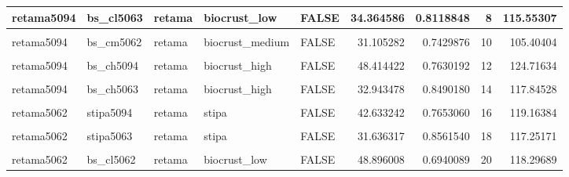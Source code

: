 \documentclass[]{article}
\begin{document}
\begin{table}[H]
{\begin{tabular}[t]{l|l|l|l|l|r|r|r|r}
\hline
retama5094 & bs\_cl5063 & retama & biocrust\_low & FALSE & 34.364586 & 0.8118848 & 8 & 115.55307\\
\hline
\cellcolor{gray!6}{retama5094} & \cellcolor{gray!6}{bs\_cm5094} & \cellcolor{gray!6}{retama} & \cellcolor{gray!6}{biocrust\_medium} & \cellcolor{gray!6}{FALSE} & \cellcolor{gray!6}{44.099499} & \cellcolor{gray!6}{0.8808309} & \cellcolor{gray!6}{9} & \cellcolor{gray!6}{132.18258}\\
\hline
retama5094 & bs\_cm5062 & retama & biocrust\_medium & FALSE & 31.105282 & 0.7429876 & 10 & 105.40404\\
\hline
\cellcolor{gray!6}{retama5094} & \cellcolor{gray!6}{bs\_cm5063} & \cellcolor{gray!6}{retama} & \cellcolor{gray!6}{biocrust\_medium} & \cellcolor{gray!6}{FALSE} & \cellcolor{gray!6}{5.892976} & \cellcolor{gray!6}{0.8384753} & \cellcolor{gray!6}{11} & \cellcolor{gray!6}{89.74050}\\
\hline
retama5094 & bs\_ch5094 & retama & biocrust\_high & FALSE & 48.414422 & 0.7630192 & 12 & 124.71634\\
\hline
\cellcolor{gray!6}{retama5094} & \cellcolor{gray!6}{bs\_ch5062} & \cellcolor{gray!6}{retama} & \cellcolor{gray!6}{biocrust\_high} & \cellcolor{gray!6}{FALSE} & \cellcolor{gray!6}{38.305420} & \cellcolor{gray!6}{0.7500951} & \cellcolor{gray!6}{13} & \cellcolor{gray!6}{113.31493}\\
\hline
retama5094 & bs\_ch5063 & retama & biocrust\_high & FALSE & 32.943478 & 0.8490180 & 14 & 117.84528\\
\hline
\cellcolor{gray!6}{retama5062} & \cellcolor{gray!6}{retama5063} & \cellcolor{gray!6}{retama} & \cellcolor{gray!6}{retama} & \cellcolor{gray!6}{TRUE} & \cellcolor{gray!6}{32.057704} & \cellcolor{gray!6}{0.8394976} & \cellcolor{gray!6}{15} & \cellcolor{gray!6}{216.00746}\\
\hline
retama5062 & stipa5094 & retama & stipa & FALSE & 42.633242 & 0.7653060 & 16 & 119.16384\\
\hline
\cellcolor{gray!6}{retama5062} & \cellcolor{gray!6}{stipa5062} & \cellcolor{gray!6}{retama} & \cellcolor{gray!6}{stipa} & \cellcolor{gray!6}{FALSE} & \cellcolor{gray!6}{37.522843} & \cellcolor{gray!6}{0.5339814} & \cellcolor{gray!6}{17} & \cellcolor{gray!6}{90.92099}\\
\hline
retama5062 & stipa5063 & retama & stipa & FALSE & 31.636317 & 0.8561540 & 18 & 117.25171\\
\hline
\cellcolor{gray!6}{retama5062} & \cellcolor{gray!6}{bs\_cl5094} & \cellcolor{gray!6}{retama} & \cellcolor{gray!6}{biocrust\_low} & \cellcolor{gray!6}{FALSE} & \cellcolor{gray!6}{43.684561} & \cellcolor{gray!6}{0.7455036} & \cellcolor{gray!6}{19} & \cellcolor{gray!6}{118.23492}\\
\hline
retama5062 & bs\_cl5062 & retama & biocrust\_low & FALSE & 48.896008 & 0.6940089 & 20 & 118.29689\\
\hline
\end{tabular}}
\end{table}
\end{document}
